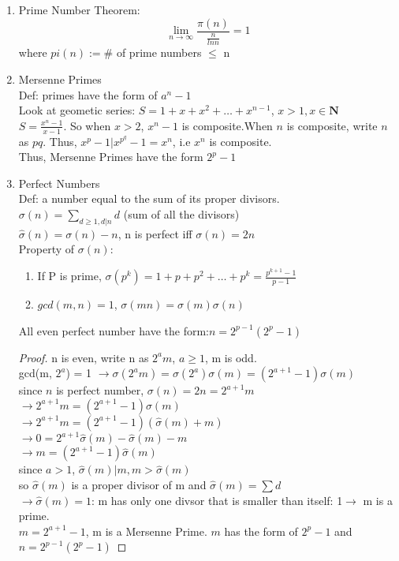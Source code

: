 \documentclass[10pt]{article}
\newcommand{\Nb}{\mathbf{N}}
\begin{document}
\begin{multicols}{2}
\begin{enumerate}
	\item Prime Number Theorem:
	$$\lim_{n\rightarrow \infty}\frac{\pi(n)}{\frac{n}{lnn}} = 1 $$
	where $pi(n):= \#$ of prime numbers $\le$ n
	
	\item Mersenne Primes\\
	Def: primes have the form of $a^n - 1$\\
	Look at geometic series: $S = 1 + x + x^2 +\dots + x^{n-1}$, $x > 1, x\in \Nb$\\
	$S = \frac{x^n-1}{x-1}$. So when $x > 2$, $x^n - 1$ is composite.When $n$ is composite, write $n$ as $pq$. Thus, $x^p-1 | x^{p^q} - 1 = x^n$, i.e $x^n$ is composite.\\
	Thus, Mersenne Primes have the form $2^p - 1$
	
	\item Perfect Numbers\\
	Def: a number equal to the sum of its proper divisors.\\
	$\sigma(n)= \sum_{d \ge 1, d|n}d$  (sum of all the divisors)\\
	$\hat{\sigma}(n) = \sigma(n) - n$, n is perfect iff $\sigma(n) = 2n$\\
	Property of $\sigma(n)$:
	\begin{enumerate}
		\item If P is prime, $\sigma(p^k) = 1 + p + p^2 + \dots + p^k = \frac{p^{k+1}-1}{p-1}$
		\item $gcd(m,n) = 1$, $\sigma(mn) = \sigma(m)\sigma(n)$
	\end{enumerate}
	All even perfect number have the form:$n = 2^{p-1}(2^p-1)$
	\begin{proof}
		n is even, write n as $2^am$, $a \ge 1$, m is odd.\\
		gcd(m, $2^a$) = 1 $\rightarrow \sigma(2^am) = \sigma(2^a)\sigma(m) = (2^{a+1} - 1)\sigma(m)$\\
		since $n$ is perfect number, $\sigma(n) = 2n = 2^{a+1}m$\\
		$\rightarrow 2^{a+1}m = (2^{a+1} - 1)\sigma(m)$\\
		$\rightarrow 2^{a+1}m = (2^{a+1} - 1)(\hat{\sigma}(m) + m)$\\
		$\rightarrow 0 = 2^{a+1}\hat{\sigma}(m) - \hat{\sigma}(m) - m$\\
		$\rightarrow m = (2^{a+1}-1)\hat{\sigma}(m)$\\
		since $a > 1$, $\hat{\sigma}(m)|m, m > \hat{\sigma}(m)$\\
		so $\hat{\sigma}(m)$ is a proper divisor of m and $\hat{\sigma}(m) = \sum d$\\
		$\rightarrow \hat{\sigma}(m) = 1$: m has only one divsor that is smaller than itself: 1$\rightarrow$ m is a prime.\\
		$m = 2^{a+1}-1$, m is a Mersenne Prime. $m$ has the form of $2^p-1$ and $n = 2^{p-1}(2^p-1)$
	\end{proof}


\end{enumerate}
\end{multicols}
\end{document}
